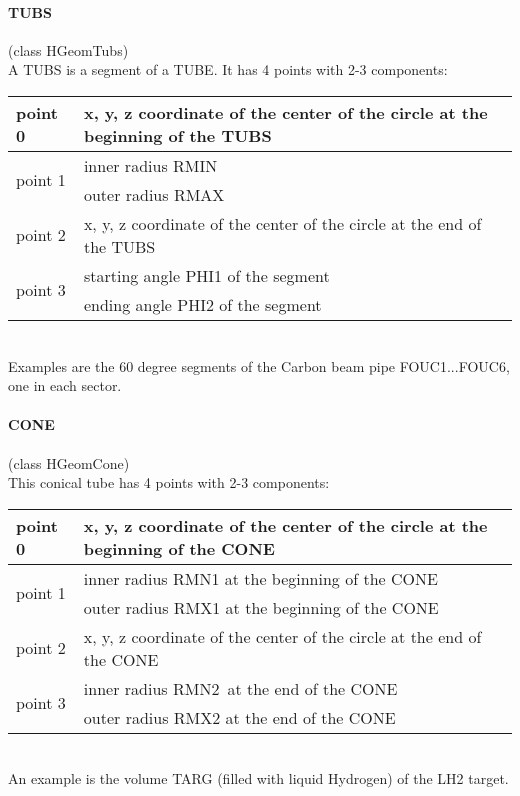 \paragraph{TUBS} (class HGeomTubs)\\
A TUBS is a segment of a TUBE. It has 4 points with 2-3 components:\\
\begin{tabular}{|l|l|}
  \hline
  point 0                  & x, y, z coordinate of the center of the circle at the beginning of the TUBS\\
  \hline
  \multirow{2}{*}{point 1} & inner radius RMIN\\
                           & outer radius RMAX\\
  \hline
  point 2                  & x, y, z coordinate of the center of the circle at the end of the TUBS\\
  \hline
  \multirow{2}{*}{point 3} & starting angle PHI1 of the segment\\
                           & ending angle PHI2 of the segment\\
   \hline
\end{tabular}\\[1.5px]
Examples are the 60 degree segments of the Carbon beam pipe FOUC1...FOUC6, one in each sector.

\paragraph{CONE} (class HGeomCone)\\
This conical tube has 4 points with 2-3 components:\\
\begin{tabular}{|l|l|}
  \hline
  point 0                  & x, y, z coordinate of the center of the circle at the beginning of the CONE\\
  \hline
  \multirow{2}{*}{point 1} & inner radius RMN1 at the beginning of the CONE\\
                           & outer radius RMX1 at the beginning of the CONE\\
  \hline
  point 2                  & x, y, z coordinate of the center of the circle at the end of the CONE\\
  \hline
  \multirow{2}{*}{point 3} & inner radius RMN2\ at the end of the CONE\\
                           & outer radius RMX2 at the end of the CONE\\
  \hline
\end{tabular}\\[1.5px]
An example is the volume TARG (filled with liquid Hydrogen) of the LH2 target.

